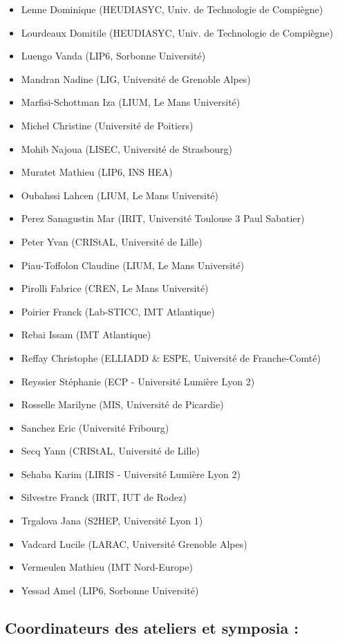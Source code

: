 \begin{itemize}
	\item[] Lenne Dominique (HEUDIASYC, Univ. de Technologie de Compiègne)
	\item[] Lourdeaux Domitile (HEUDIASYC, Univ. de Technologie de Compiègne)
	\item[] Luengo Vanda (LIP6, Sorbonne Université)
	\item[] Mandran Nadine (LIG, Université de Grenoble Alpes)
	\item[] Marfisi-Schottman Iza (LIUM, Le Mans Université)
	\item[] Michel Christine (Université de Poitiers)
	\item[] Mohib Najoua (LISEC, Université de Strasbourg)
	\item[] Muratet Mathieu (LIP6, INS HEA)
	\item[] Oubahssi Lahcen (LIUM, Le Mans Université)
	\item[] Perez Sanagustin Mar (IRIT, Université Toulouse 3 Paul Sabatier)
	\item[] Peter Yvan (CRIStAL, Université de Lille)
	\item[] Piau-Toffolon Claudine (LIUM, Le Mans Université)
	\item[] Pirolli Fabrice (CREN, Le Mans Université)
	\item[] Poirier Franck (Lab-STICC, IMT Atlantique)
	\item[] Rebai Issam (IMT Atlantique)
	\item[] Reffay Christophe (ELLIADD \& ESPE, Université de Franche-Comté)
	\item[] Reyssier Stéphanie (ECP - Université Lumière Lyon 2)
	\item[] Rosselle Marilyne (MIS, Université de Picardie)
	\item[] Sanchez Eric (Université Fribourg)
	\item[] Secq Yann (CRIStAL, Université de Lille)
	\item[] Sehaba Karim (LIRIS - Université Lumière Lyon 2)
	\item[] Silvestre Franck (IRIT, IUT de Rodez)
	\item[] Trgalova Jana (S2HEP, Université Lyon 1)
	\item[] Vadcard Lucile (LARAC, Université Grenoble Alpes)
	\item[] Vermeulen Mathieu (IMT Nord-Europe)
	\item[] Yessad Amel (LIP6, Sorbonne Université)
\end{itemize}

\subsection*{Coordinateurs des ateliers et symposia : }


